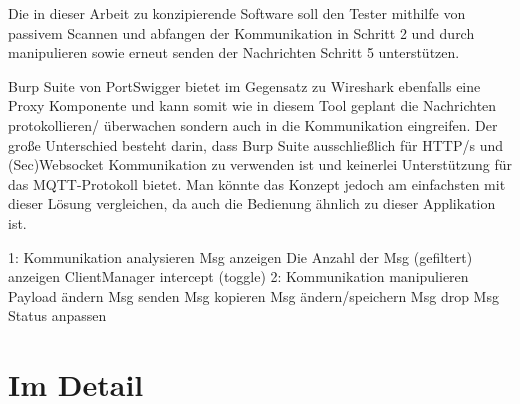     Die in dieser Arbeit zu konzipierende Software soll den Tester mithilfe von passivem Scannen und abfangen der Kommunikation in Schritt 2 und durch manipulieren sowie erneut senden der Nachrichten Schritt 5 unterstützen.
    
    
    Burp Suite von PortSwigger bietet im Gegensatz zu Wireshark ebenfalls eine Proxy Komponente und kann somit wie in diesem Tool geplant die Nachrichten protokollieren/ überwachen sondern auch in die Kommunikation eingreifen. Der große Unterschied besteht darin, dass Burp Suite ausschließlich für HTTP/s und (Sec)Websocket Kommunikation zu verwenden ist und keinerlei Unterstützung für das \ac{MQTT}-Protokoll bietet. Man könnte das Konzept jedoch am einfachsten mit dieser Lösung vergleichen, da auch die Bedienung ähnlich zu dieser Applikation ist.
    
    


    1: Kommunikation analysieren
    	Msg anzeigen
    	Die Anzahl der Msg (gefiltert) anzeigen
    	ClientManager intercept (toggle)
    2: Kommunikation manipulieren
    	Payload ändern
    	Msg senden
    	Msg kopieren
    	Msg ändern/speichern
    	Msg drop
    	Msg Status anpassen


\section{Im Detail}
    

